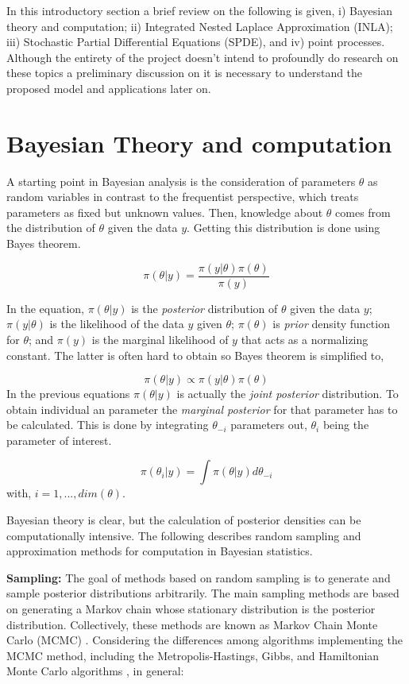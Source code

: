 \documentclass[
]{book}
\begin{document}
In this introductory section a brief review on the following is given, i) Bayesian theory and computation; ii) Integrated Nested Laplace Approximation (INLA); iii) Stochastic Partial Differential Equations (SPDE), and iv) point processes. Although the entirety of the project doesn't intend to profoundly do research on these topics a preliminary discussion on it is necessary to understand the proposed model and applications later on.

\hypertarget{bayesian-theory-and-computation}{%
\section*{Bayesian Theory and computation}\label{bayesian-theory-and-computation}}

A starting point in Bayesian analysis is the consideration of parameters \(\theta\) as random variables in contrast to the frequentist perspective, which treats parameters as fixed but unknown values. Then, knowledge about \(\theta\) comes from the distribution of \(\theta\) given the data \(y\). Getting this distribution is done using Bayes theorem.

\[\pi(\theta|y)=\frac{\pi(y|\theta)\pi(\theta)}{\pi(y)}\]

In the equation, \(\pi(\theta|y)\) is the \emph{posterior} distribution of \(\theta\) given the data \(y\); \(\pi(y|\theta)\) is the likelihood of the data \(y\) given \(\theta\); \(\pi(\theta)\) is \emph{prior} density function for \(\theta\); and \(\pi(y)\) is the marginal likelihood of \(y\) that acts as a normalizing constant. The latter is often hard to obtain so Bayes theorem is simplified to,

\[\pi(\theta|y)\propto\pi(y|\theta)\pi(\theta)\]
In the previous equations \(\pi(\theta|y)\) is actually the \emph{joint posterior} distribution. To obtain individual an parameter the \emph{marginal posterior} for that parameter has to be calculated. This is done by integrating \(\theta_{-i}\) parameters out, \(\theta_{i}\) being the parameter of interest.

\[\pi(\theta_{i}|y)=\int\pi(\theta|y)d\theta_{-i}\]
with, \(i=1,...,dim(\theta)\).

Bayesian theory is clear, but the calculation of posterior densities can be computationally intensive. The following describes random sampling and approximation methods for computation in Bayesian statistics.

\textbf{Sampling:} The goal of methods based on random sampling is to generate and sample posterior distributions arbitrarily. The main sampling methods are based on generating a Markov chain whose stationary distribution is the posterior distribution. Collectively, these methods are known as Markov Chain Monte Carlo (MCMC) \citep{gelfand_sampling-based_1990, hastings_monte_1970}. Considering the differences among algorithms implementing the MCMC method, including the Metropolis-Hastings, Gibbs, and Hamiltonian Monte Carlo algorithms \citep{hastings_monte_1970, neal_how_2012, smith_bayesian_1993}, in general:
\end{document}
